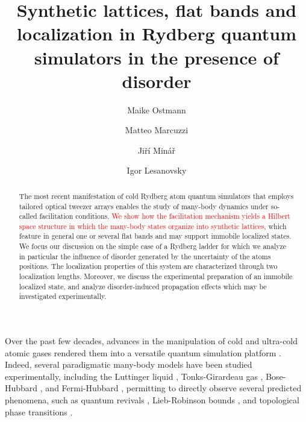 \documentclass[prl,aps,twocolumn,showpacs,superscriptaddress,longbibliography]{revtex4-1}
\newcommand{\changer}[1]{\textcolor{red}{#1}}
\begin{document}
\title{Synthetic lattices, flat bands and localization in Rydberg quantum simulators in the presence of disorder}

\author{Maike Ostmann}
\author{Matteo Marcuzzi}
\author{Ji\v{r}\'{i} Min\'{a}\v{r}}
\author{Igor Lesanovsky}



\begin{abstract}
The most recent manifestation of cold Rydberg atom quantum simulators that employs tailored optical tweezer arrays enables the study of many-body dynamics under so-called facilitation conditions. \changer{We show how the facilitation mechanism yields a Hilbert space structure in which the many-body states organize into synthetic lattices}, which feature in general one or several flat bands and may support immobile localized states. We focus our discussion on the simple case of a Rydberg ladder for which we analyze in particular the influence of disorder generated by the uncertainty of the atoms positions. The localization properties of this system are characterized through two localization lengths. Moreover, we discuss the experimental preparation of an immobile localized state, and analyze disorder-induced propagation effects which may be investigated experimentally.
\end{abstract}
\pacs{}
\maketitle


Over the past few decades, advances in the manipulation of cold and ultra-cold atomic gases rendered them into a versatile quantum simulation platform \cite{Bloch_2008,Bloch_2012}. Indeed, several paradigmatic many-body models have been studied experimentally, including the Luttinger liquid \cite{hofferberth2007}, Tonks-Girardeau gas \cite{kinoshita2004}, Bose-Hubbard \cite{greiner2002, greiner2003}, and Fermi-Hubbard \cite{Kohl2005}, permitting to directly observe several predicted phenomena, such as quantum revivals \cite{greiner2002_revival}, Lieb-Robinson bounds \cite{cheneau2012}, and topological phase transitions \cite{hadzibabic2006}.
\end{document}
